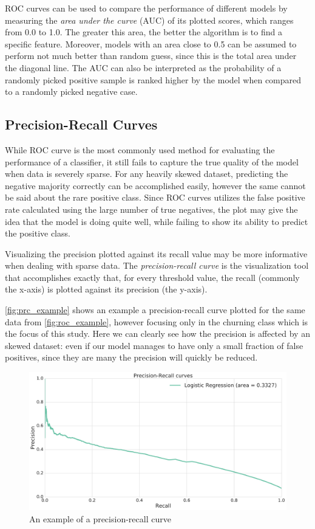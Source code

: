 \documentclass{kththesis}
\begin{document}
ROC curves can be used to compare the performance of different models by measuring the \emph{area under the curve} (AUC) of its plotted scores, which ranges from 0.0 to 1.0. The greater this area, the better the algorithm is to find a specific feature. Moreover, models with an area close to 0.5 can be assumed to perform not much better than random guess, since this is the total area under the diagonal line. The AUC can also be interpreted as the probability of a randomly picked positive sample is ranked higher by the model when compared to a randomly picked negative case.

\subsection{Precision-Recall Curves}

While ROC curve is the most commonly used method for evaluating the performance of a classifier, it still fails to capture the true quality of the model when data is severely sparse. For any heavily skewed dataset, predicting the negative majority correctly can be accomplished easily, however the same cannot be said about the rare positive class. Since ROC curves utilizes the false positive rate calculated using the large number of true negatives, the plot may give the idea that the model is doing quite well, while failing to show its ability to predict the positive class. 

Visualizing the precision plotted against its recall value may be more informative when dealing with sparse data. The \emph{precision-recall curve} is the visualization tool that accomplishes exactly that, for every threshold value, the recall (commonly the x-axis) is plotted against its precision (the y-axis). 

\autoref{fig:prc_example} shows an example a precision-recall curve plotted for the same data from \autoref{fig:roc_example}, however focusing only in the churning class which is the focus of this study. Here we can clearly see how the precision is affected by an skewed dataset: even if our model manages to have only a small fraction of false positives, since they are many the precision will quickly be reduced.

\begin{figure}[h]
    \centering
    \includegraphics[width=1.0\textwidth,keepaspectratio]{figures/prc_example.pdf}
    \caption{An example of a precision-recall curve}
    \label{fig:prc_example}
\end{figure}
\end{document}
